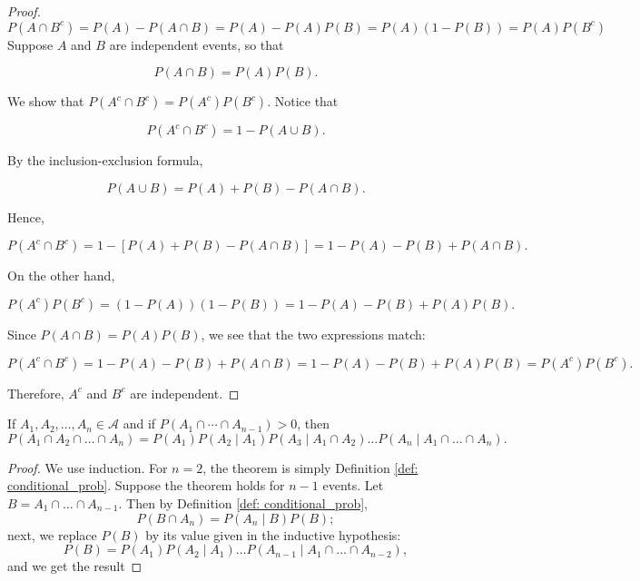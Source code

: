 \documentclass[../main.tex]{subfiles}
\begin{document}
\begin{proof}
\[
P(A \cap B^c) = P(A) - P(A \cap B) = P(A) - P(A) P(B) = P(A)(1 - P(B)) = P(A)P(B^c)
\]
Suppose \( A \) and \( B \) are independent events, so that
    
\[
P(A \cap B) = P(A) P(B).
\]

We show that \( P(A^c \cap B^c) = P(A^c) P(B^c) \). Notice that

\[
P(A^c \cap B^c) = 1 - P(A \cup B).
\]

By the inclusion-exclusion formula,

\[
P(A \cup B) = P(A) + P(B) - P(A \cap B).
\]

Hence,

\[
P(A^c \cap B^c) = 1 - \left[ P(A) + P(B) - P(A \cap B) \right] = 1 - P(A) - P(B) + P(A \cap B).
\]

On the other hand,

\[
P(A^c) P(B^c) = (1 - P(A))(1 - P(B)) = 1 - P(A) - P(B) + P(A) P(B).
\]

Since \( P(A \cap B) = P(A) P(B) \), we see that the two expressions match:

\[
P(A^c \cap B^c) = 1 - P(A) - P(B) + P(A \cap B) = 1 - P(A) - P(B) + P(A) P(B) = P(A^c) P(B^c).
\]

Therefore, \( A^c \) and \( B^c \) are independent.
\end{proof}

\begin{proposition}\label{prop:partition equation}
If \(A_1, A_2, \dots, A_n \in \mathcal{A}\) and if $ P(A_1 \cap \cdots \cap A_{n-1}) > 0$, then  
\[
P(A_1 \cap A_2 \cap \dots \cap A_n) = P(A_1)P(A_2 \mid A_1)P(A_3 \mid A_1 \cap A_2) \dots P(A_n \mid A_1 \cap \dots \cap A_n).
\]
\end{proposition}

\begin{proof}
    We use induction. For \( n = 2 \), the theorem is simply Definition \ref{def: conditional_prob}. Suppose the theorem holds for \( n-1 \) events. Let \( B = A_1 \cap \dots \cap A_{n-1} \). Then by Definition \ref{def: conditional_prob},
    \[
    P(B \cap A_n) = P(A_n \mid B) P(B);
    \]
    next, we replace \( P(B) \) by its value given in the inductive hypothesis:
    \[
    P(B) = P(A_1) P(A_2 \mid A_1) \dots P(A_{n-1} \mid A_1 \cap \dots \cap A_{n-2}),
    \]
    and we get the result
\end{proof}
\end{document}
